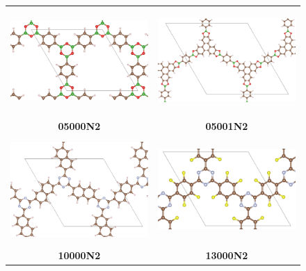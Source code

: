 \begin{figure}[H]


\centering
\begin{tabular}{cc}
\includegraphics[height=4cm]{images/05000.png} & \includegraphics[height=4cm]{images/050001.png} \\ 
\textbf{05000N2}\par\medskip & \textbf{05001N2}\par\medskip\\
\includegraphics[height=4cm]{images/10000.png} & \includegraphics[height=4cm]{images/13000.png} \\
\textbf{10000N2}\par\medskip & \textbf{13000N2}\par\medskip\\

\end{tabular}
\end{figure}
